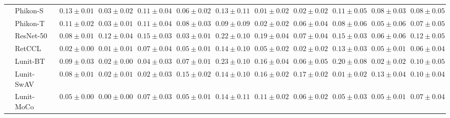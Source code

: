 \begin{tabular}{ll|cccc|c|cccc|c}
 & Phikon-S~\cite{filiot2023scaling} & $0.13 \pm 0.01$ & $0.03 \pm 0.02$ & $0.11 \pm 0.04$ & $0.06 \pm 0.02$ & $0.13 \pm 0.11$ & $\mathbf{0.01 \pm 0.02}$ & $\mathbf{0.02 \pm 0.02}$ & $0.11 \pm 0.05$ & $0.08 \pm 0.03$ & $0.08 \pm 0.05$ \\
 & Phikon-T~\cite{filiot2023scaling} & $0.11 \pm 0.02$ & $0.03 \pm 0.01$ & $0.11 \pm 0.04$ & $0.08 \pm 0.03$ & $0.09 \pm 0.09$ & $0.02 \pm 0.02$ & $0.06 \pm 0.04$ & $0.08 \pm 0.06$ & $0.05 \pm 0.06$ & $0.07 \pm 0.05$ \\
 & ResNet-50~\cite{he2015deep} & $0.08 \pm 0.01$ & $0.12 \pm 0.04$ & $0.15 \pm 0.03$ & $0.03 \pm 0.01$ & $0.22 \pm 0.10$ & $0.19 \pm 0.04$ & $0.07 \pm 0.04$ & $0.15 \pm 0.03$ & $0.06 \pm 0.06$ & $0.12 \pm 0.05$ \\
 & RetCCL~\cite{wang2023retccl} & $0.02 \pm 0.00$ & $0.01 \pm 0.01$ & $0.07 \pm 0.04$ & $0.05 \pm 0.01$ & $0.14 \pm 0.10$ & $0.05 \pm 0.02$ & $0.02 \pm 0.02$ & $0.13 \pm 0.03$ & $0.05 \pm 0.01$ & $0.06 \pm 0.04$ \\
 & Lunit-BT~\cite{kang2023benchmarking} & $0.09 \pm 0.03$ & $0.02 \pm 0.00$ & $0.04 \pm 0.03$ & $0.07 \pm 0.01$ & $0.23 \pm 0.10$ & $0.16 \pm 0.04$ & $0.06 \pm 0.05$ & $0.20 \pm 0.08$ & $0.02 \pm 0.02$ & $0.10 \pm 0.05$ \\
 & Lunit-SwAV~\cite{kang2023benchmarking} & $0.08 \pm 0.01$ & $0.02 \pm 0.01$ & $\mathbf{0.02 \pm 0.03}$ & $0.15 \pm 0.02$ & $0.14 \pm 0.10$ & $0.16 \pm 0.02$ & $0.17 \pm 0.02$ & $\mathbf{0.01 \pm 0.02}$ & $0.13 \pm 0.04$ & $0.10 \pm 0.04$ \\
 & Lunit-MoCo~\cite{kang2023benchmarking} & $0.05 \pm 0.00$ & $\mathbf{0.00 \pm 0.00}$ & $0.07 \pm 0.03$ & $0.05 \pm 0.01$ & $0.14 \pm 0.11$ & $0.11 \pm 0.02$ & $0.06 \pm 0.02$ & $0.05 \pm 0.03$ & $0.05 \pm 0.01$ & $0.07 \pm 0.04$ \\
\cline{1-12}
\bottomrule
\end{tabular}
